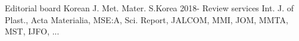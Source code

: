 

\begin{cvhonors}

  \cvhonor
    {Editorial board}
    {Korean J. Met. Mater.}
    {S.Korea} %
    {2018-} %
    \cvhonor
    {Review services}
    {Int. J. of Plast., Acta Materialia, MSE:A, Sci. Report, JALCOM, MMI, JOM, MMTA, MST, IJFO, ...}
    {}
    {} %
\end{cvhonors}
